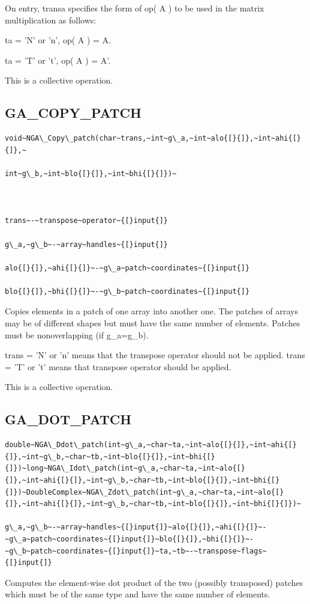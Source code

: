 On entry, transa specifies the form of op( A ) to be used in the matrix
multiplication as follows:

ta = 'N' or 'n', op( A ) = A.

ta = 'T' or 't', op( A ) = A'.

This is a collective operation. 


\subsection*{GA\_COPY\_PATCH}
\begin{verbatim}
void~NGA\_Copy\_patch(char~trans,~int~g\_a,~int~alo{[}{]},~int~ahi{[}{]},~

int~g\_b,~int~blo{[}{]},~int~bhi{[}{]})~



trans~-~transpose~operator~{[}input{]}

g\_a,~g\_b~-~array~handles~{[}input{]}

alo{[}{]},~ahi{[}{]}~-~g\_a~patch~coordinates~{[}input{]}

blo{[}{]},~bhi{[}{]}~-~g\_b~patch~coordinates~{[}input{]}
\end{verbatim}
Copies elements in a patch of one array into another one. The patches
of arrays may be of different shapes but must have the same number
of elements. Patches must be nonoverlapping (if g\_a=g\_b).

trans = 'N' or 'n' means that the transpose operator should not be
applied. trans = 'T' or 't' means that transpose operator should be
applied.

This is a collective operation. 


\subsection*{GA\_DOT\_PATCH}
\begin{verbatim}
double~NGA\_Ddot\_patch(int~g\_a,~char~ta,~int~alo{[}{]},~int~ahi{[}{]},~int~g\_b,~char~tb,~int~blo{[}{]},~int~bhi{[}{]})~long~NGA\_Idot\_patch(int~g\_a,~char~ta,~int~alo{[}{]},~int~ahi{[}{]},~int~g\_b,~char~tb,~int~blo{[}{]},~int~bhi{[}{]})~DoubleComplex~NGA\_Zdot\_patch(int~g\_a,~char~ta,~int~alo{[}{]},~int~ahi{[}{]},~int~g\_b,~char~tb,~int~blo{[}{]},~int~bhi{[}{]})~

g\_a,~g\_b~-~array~handles~{[}input{]}~alo{[}{]},~ahi{[}{]}~-~g\_a~patch~coordinates~{[}input{]}~blo{[}{]},~bhi{[}{]}~-~g\_b~patch~coordinates~{[}input{]}~ta,~tb~-~transpose~flags~{[}input{]}
\end{verbatim}
Computes the element-wise dot product of the two (possibly transposed)
patches which must be of the same type and have the same number of
elements.

